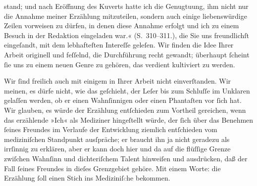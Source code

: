{{{                     stand; und nach Eröffnung des Kuverts hatte ich die Genugtuung, ihm nicht nur
                     die Annahme meiner Erzählung mitzuteilen, sondern auch einige liebenswürdige
                     Zeilen vorweisen zu dürfen, in denen diese Annahme erfolgt und ich zu einem
                     Besuch in der Redaktion eingeladen war.« (S. 310–311.)}}}\label{K_L02551-1}, die Sie uns
               freundlichſt eingeſandt, mit dem lebhafteſten Intereſſe geleſen. Wir finden die Idee
               Ihrer Arbeit originell und
               feſſelnd, die Durchführung recht gewandt; überhaupt{ }ſcheint{ }ſie uns zu einem neuen
               Genre zu gehören, das verdient kultiviert zu werden.\pend
           
\pstart
           Wir{ }ſind freilich auch mit einigem in Ihrer Arbeit nicht {\pb}einverſtanden.
               Wir meinen, es dürfe nicht, wie das geſchieht, der Leſer bis zum Schluſſe im Unklaren
               gelaſſen werden, ob er einen Wahnſinnigen oder einen Phantaſten vor{ }ſich hat. Wir
               glauben, es würde der Erzählung entſchieden zum Vortheil gereichen, wenn das erzählende »Ich« als
               Mediziner hingeſtellt würde, der{ }ſich über das Benehmen{ }ſeines Freundes im Verlaufe
               der Entwicklung ziemlich entſchieden vom mediziniſchen Standpunkt ausſpräche; er
               braucht ihn ja nicht geradezu als irrſinnig zu erklären, aber er kann doch hier und
               da auf die flüſſige Grenze zwiſchen Wahnſinn und dichteriſchem Talent hinweiſen und
               ausdrücken, daß {\pb}der Fall{ }ſeines Freundes in dieſes
               Grenzgebiet gehöre. Mit einem Worte: die Erzählung{ }ſoll einen Stich ins
                  Mediziniſ\textcolor{gray}{c}he bekommen.\pend
           

